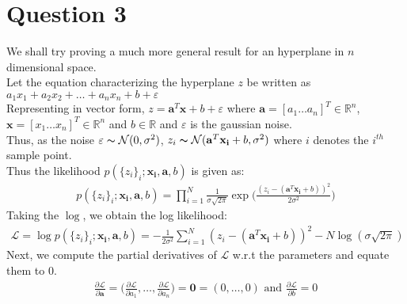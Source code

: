 \documentclass[11pt, fleqn]{article}
\begin{document}
\newpage
\section*{Question 3}
\setcounter{equation}{0}
We shall try proving a much more general result for an hyperplane in $n$ dimensional space.\\
Let the equation characterizing the hyperplane $z$ be written as $a_1x_1 + a_2x_2 + \ldots + a_nx_n + b + \varepsilon $\\
Representing in vector form, $z = \mathbf{a}^T\mathbf{x} + b + \varepsilon$ where $\mathbf{a} = [a_1 \ldots a_n]^T \in \mathbb{R}^n$, $\mathbf{x} = [x_1 \ldots x_n]^T \in \mathbb{R}^n$ and $b \in \mathbb{R}$ and $\varepsilon$ is the gaussian noise.\\
Thus, as the noise $\varepsilon \thicksim \mathcal{N}(0, \sigma^2)$, 
$ z_i \thicksim \mathcal{N}( \mathbf{a}^T\mathbf{x_i}+b, \sigma^2) $ where $i$ denotes the $i^{th}$ sample point.\\
Thus the likelihood $p(\{z_i\}_i;\mathbf{x_i}, \mathbf{a}, b)$ is given as:
\begin{equation*}
    \begin{split}
        p(\{z_i\}_i;\mathbf{x_i}, \mathbf{a}, b) = \prod_{i=1}^{N}\frac{1}{\sigma\sqrt{2\pi}} \exp{\bigg(\frac{(z_i - (\mathbf{a}^T\mathbf{x_i} + b))^2}{2\sigma^2}\bigg)}
    \end{split}
\end{equation*}
Taking the $\log$, we obtain the log likelihood:
\begin{equation}
    \label{logl}
    \begin{split}
        \boxed{\mathcal{L} = \log{p(\{z_i\}_i;\mathbf{x_i}, \mathbf{a}, b)} = -\frac{1}{{2\sigma^2}}\sum_{i=1}^{N} (z_i - (\mathbf{a}^T\mathbf{x_i} + b))^2 - N\log(\sigma\sqrt{2\pi})}
    \end{split}
\end{equation}
Next, we compute the partial derivatives of $\mathcal{L}$ w.r.t the parameters and equate them to 0.
\begin{equation*}
    \begin{split}
        \frac{\partial \mathcal{L}}{\partial \mathbf{a}} = \bigg( \frac{\partial \mathcal{L}}{\partial a_1}, \ldots, \frac{\partial \mathcal{L}}{\partial a_n} \bigg) = \mathbf{0} = (0, \dots, 0) \text{ and } \frac{\partial \mathcal{L}}{\partial b} = 0 
    \end{split}
\end{equation*}
\end{document}
